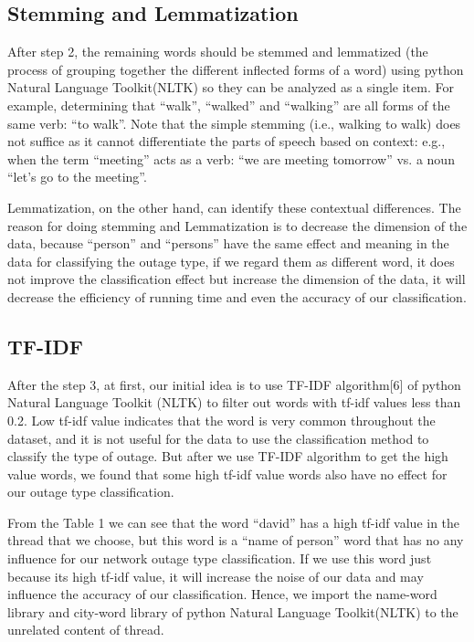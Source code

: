 \documentclass{sig-alternate}
\begin{document}
\subsection{Stemming and Lemmatization}
After step 2, the remaining words should be stemmed and  lemmatized (the process of grouping together the different inflected forms of a word) using python Natural Language Toolkit(NLTK) so they can be analyzed as a single item. For example, determining that “walk”, “walked” and “walking” are all forms of the same verb: “to walk”. Note that the simple stemming (i.e., walking to walk) does not suffice as it cannot differentiate the parts of speech based on context: e.g., when the term “meeting” acts as a verb: “we are meeting tomorrow” vs. a noun “let’s go to the meeting”. 
\par Lemmatization, on the other hand, can identify these contextual differences. The reason for doing stemming and Lemmatization is to decrease the dimension of the data, because “person” and “persons” have the same effect and meaning in the data for classifying the outage type, if we regard them as different word, it does not improve the classification effect but increase the dimension of the data, it will decrease the efficiency of running time and even the accuracy of our classification.

\subsection{TF-IDF}
After the step 3, at first, our initial idea is to use TF-IDF algorithm[6] of python Natural Language Toolkit (NLTK) to filter out words with tf-idf values less than 0.2. Low tf-idf value indicates that the word is very common throughout the dataset, and it is not useful for the data to use the classification method to classify the type of outage. But after we use TF-IDF algorithm to get the high value words, we found that some high tf-idf value words also have no effect for our outage type classification. 
\par From the Table 1 we can see that the word “david” has a high tf-idf value in the thread that we choose, but this word is a “name of person” word that has no any influence for our network outage type classification. If we use this word just because its high tf-idf value, it will increase the noise of our data and may influence the accuracy of our classification. Hence, we import the name-word library and city-word library of python Natural Language Toolkit(NLTK) to the unrelated content of thread.
\end{document}
